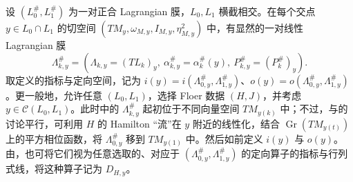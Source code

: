 设 $(L_0^\#,\allowbreak L_1^\#)$ 为一对正合 Lagrangian 膜，$L_0,\allowbreak L_1$ 横截相交。在每个交点 $y\in L_0\cap L_1$ 的切空间 $(TM_y,\allowbreak \omega_{M,\allowbreak y},\allowbreak I_{M,\allowbreak y},\allowbreak \eta_{M,\allowbreak y}^2)$ 中，有显然的一对线性 Lagrangian 膜
\begin{equation}\label{eq:12.1}
\Lambda_{k,y}^\#=(\Lambda_{k,y}=(TL_k)_y,\ \alpha_{k,y}^\#=\alpha_k^\#(y),\ P_{k,y}^\#=(P_k^\#)_y).
\end{equation}
取定义的指标与定向空间，记为 $i(y)=i(\Lambda_{0,\allowbreak y}^\#,\allowbreak \Lambda_{1,\allowbreak y}^\#)$、$o(y)=o(\Lambda_{0,\allowbreak y}^\#,\allowbreak \Lambda_{1,\allowbreak y}^\#)$。更一般地，允许任意 $(L_0,\allowbreak L_1)$，选择 Floer 数据 $(H,\allowbreak J)$，并考虑 $y\in\mathcal C(L_0,\allowbreak L_1)$。此时中的 $\Lambda_{k,\allowbreak y}^\#$ 起初位于不同向量空间 $TM_{y(k)}$ 中；不过，与的讨论平行，可利用 $H$ 的 Hamilton “流”在 $y$ 附近的线性化，结合 $\operatorname{Gr}(TM_{y(t)})$ 上的平方相位函数，将 $\Lambda_{0,\allowbreak y}^\#$ 移到 $TM_{y(1)}$ 中。然后如前定义 $i(y)$ 与 $o(y)$。由，也可将它们视为任意选取的、对应于 $(\Lambda_{0,\allowbreak y}^\#,\allowbreak \Lambda_{1,\allowbreak y}^\#)$ 的定向算子的指标与行列式线，将这种算子记为 $D_{H,\allowbreak y}$。

